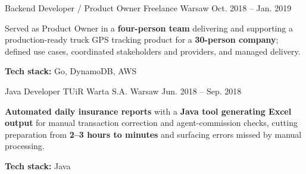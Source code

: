 \begin{cventries}
  \cventry
    {Backend Developer / Product Owner}
    {Freelance}
    {Warsaw}
    {Oct. 2018 -- Jan. 2019}
    {
      \begin{cvitems}
        \item {Served as Product Owner in a \textbf{four-person team} delivering and supporting a production-ready truck GPS tracking product for a \textbf{30-person company}; defined use cases, coordinated stakeholders and providers, and managed delivery.}
        \item {\textbf{Tech stack:} Go, DynamoDB, AWS}
      \end{cvitems}
    }

  \cventry
    {Java Developer}
    {TUiR Warta S.A.}
    {Warsaw}
    {Jun. 2018 -- Sep. 2018}
    {
      \begin{cvitems}
        \item {\textbf{Automated daily insurance reports} with a \textbf{Java tool generating Excel output} for manual transaction correction and agent-commission checks, cutting preparation from \textbf{2--3 hours to minutes} and surfacing errors missed by manual processing.}
        \item {\textbf{Tech stack:} Java}
      \end{cvitems}
    }

\end{cventries}
